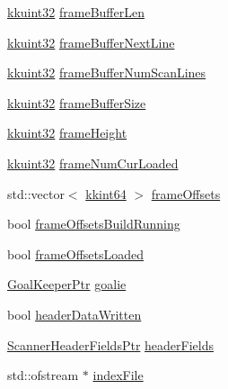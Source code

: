 \begin{DoxyCompactItemize}
\item 
\hyperlink{namespace_k_k_b_af8d832f05c54994a1cce25bd5743e19a}{kkuint32} \hyperlink{class_k_k_l_s_c_1_1_scanner_file_acaab8b4f6845f11e0a23b0d0e7d62374}{frame\+Buffer\+Len}
\item 
\hyperlink{namespace_k_k_b_af8d832f05c54994a1cce25bd5743e19a}{kkuint32} \hyperlink{class_k_k_l_s_c_1_1_scanner_file_a04ad19b685d3d4cd26ddc81a7e0f5d76}{frame\+Buffer\+Next\+Line}
\item 
\hyperlink{namespace_k_k_b_af8d832f05c54994a1cce25bd5743e19a}{kkuint32} \hyperlink{class_k_k_l_s_c_1_1_scanner_file_a23700be8017b18a9670d92938c72d74b}{frame\+Buffer\+Num\+Scan\+Lines}
\item 
\hyperlink{namespace_k_k_b_af8d832f05c54994a1cce25bd5743e19a}{kkuint32} \hyperlink{class_k_k_l_s_c_1_1_scanner_file_a101cdb2a0320f6aaefcabadc585beb34}{frame\+Buffer\+Size}
\item 
\hyperlink{namespace_k_k_b_af8d832f05c54994a1cce25bd5743e19a}{kkuint32} \hyperlink{class_k_k_l_s_c_1_1_scanner_file_a5598193d137fb79782cc1967ec830625}{frame\+Height}
\item 
\hyperlink{namespace_k_k_b_af8d832f05c54994a1cce25bd5743e19a}{kkuint32} \hyperlink{class_k_k_l_s_c_1_1_scanner_file_a5af64c395493b5864d2c90f4de2677cf}{frame\+Num\+Cur\+Loaded}
\item 
std\+::vector$<$ \hyperlink{namespace_k_k_b_aa3486b1c5ea9162b3b020c69f72826eb}{kkint64} $>$ \hyperlink{class_k_k_l_s_c_1_1_scanner_file_a61d36c66bb5f16ba82c088cd816b0c68}{frame\+Offsets}
\item 
bool \hyperlink{class_k_k_l_s_c_1_1_scanner_file_a14b9267dc74c7a04f1965aa39c817f70}{frame\+Offsets\+Build\+Running}
\item 
bool \hyperlink{class_k_k_l_s_c_1_1_scanner_file_ac7ebdb105a54fa09c7adc6520c2b0caa}{frame\+Offsets\+Loaded}
\item 
\hyperlink{namespace_k_k_b_ae74d71076d6a6eb363f18a563ac0785a}{Goal\+Keeper\+Ptr} \hyperlink{class_k_k_l_s_c_1_1_scanner_file_aea946a2d0dc2fb27b41ce5180679d3de}{goalie}
\item 
bool \hyperlink{class_k_k_l_s_c_1_1_scanner_file_af07a14225690ce6ff6c2a9194323f0d4}{header\+Data\+Written}
\item 
\hyperlink{namespace_k_k_l_s_c_a7c06efc9062d7120e1fbf26f44ce4089}{Scanner\+Header\+Fields\+Ptr} \hyperlink{class_k_k_l_s_c_1_1_scanner_file_a31b2da4ffa80bf114aab2340d3104f3e}{header\+Fields}
\item 
std\+::ofstream $\ast$ \hyperlink{class_k_k_l_s_c_1_1_scanner_file_aa82349c3a370d33508267b609e543f44}{index\+File}

\end{DoxyCompactItemize}
